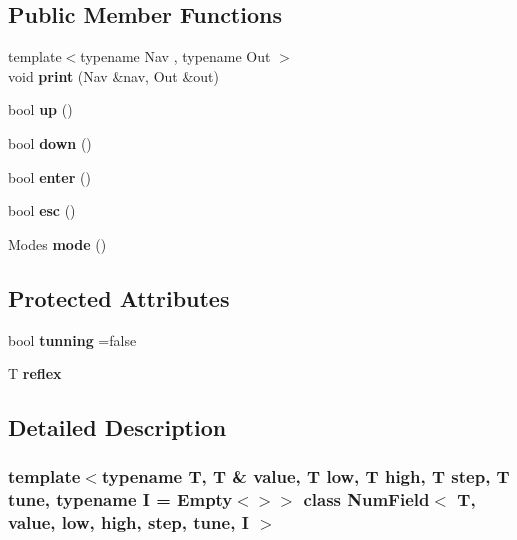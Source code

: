 \subsection*{Public Member Functions}
\begin{DoxyCompactItemize}
\item 
\mbox{\label{classNumField_a59741302593e27f69c061f13572d8b73}} 
{\footnotesize template$<$typename Nav , typename Out $>$ }\\void {\bfseries print} (Nav \&nav, Out \&out)
\item 
\mbox{\label{classNumField_a4f3b892335a275c356e1637c6353efa7}} 
bool {\bfseries up} ()
\item 
\mbox{\label{classNumField_aa8ab4efc861b39c41333a22b1089b06f}} 
bool {\bfseries down} ()
\item 
\mbox{\label{classNumField_aaa94dd7ee3cc9a75c78847bcf50cf4b1}} 
bool {\bfseries enter} ()
\item 
\mbox{\label{classNumField_a3488e09f76eed5b6937516033b1af0f9}} 
bool {\bfseries esc} ()
\item 
\mbox{\label{classNumField_ab9357585367f28c1063180322841b78c}} 
Modes {\bfseries mode} ()
\end{DoxyCompactItemize}
\subsection*{Protected Attributes}
\begin{DoxyCompactItemize}
\item 
\mbox{\label{classNumField_aa6214daa8e0081fc25e2e366a40be7ab}} 
bool {\bfseries tunning} =false
\item 
\mbox{\label{classNumField_abd57d5ad6ade75a1319893111210b215}} 
T {\bfseries reflex}
\end{DoxyCompactItemize}


\subsection{Detailed Description}
\subsubsection*{template$<$typename T, T \& value, T low, T high, T step, T tune, typename I = Empty$<$$>$$>$\newline
class Num\+Field$<$ T, value, low, high, step, tune, I $>$}

